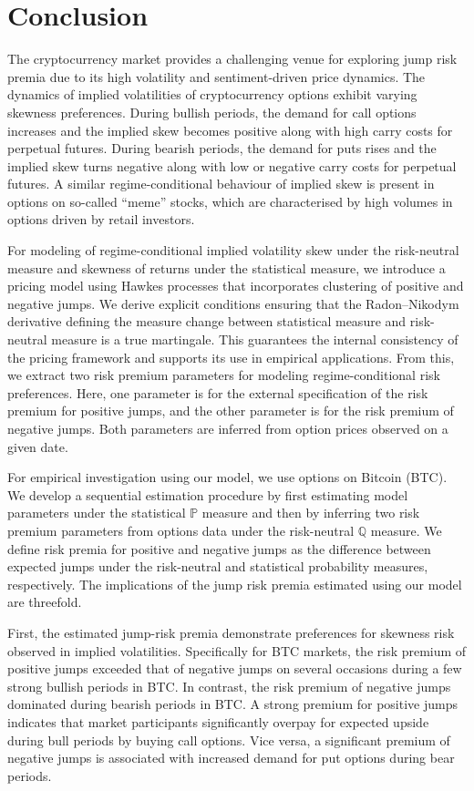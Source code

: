 \documentclass[11pt,a4paper]{article}
\numberwithin{equation}{section}
\theoremstyle{remark}
\theoremstyle{definition}
\begin{document}
\section{Conclusion}\label{sec:conclusion-and-outlook}

The cryptocurrency market provides a challenging venue for exploring jump risk premia due to its high volatility and sentiment-driven price dynamics. The dynamics of implied volatilities of cryptocurrency options exhibit varying skewness preferences. During bullish periods, the demand for call options increases and the implied skew becomes positive along with high carry costs for perpetual futures. During bearish periods, the demand for puts rises and the implied skew turns negative along with low or negative carry costs for perpetual futures. A similar regime-conditional behaviour of implied skew is present in options on so-called ``meme'' stocks, which are characterised by high volumes in options driven by retail investors.

For modeling of regime-conditional implied volatility skew under the risk-neutral measure and skewness of returns under the statistical measure, we introduce a pricing model using Hawkes processes that incorporates clustering of positive and negative jumps. We derive explicit conditions ensuring that the Radon–Nikodym derivative defining the measure change between statistical measure and risk-neutral measure is a true martingale. This guarantees the internal consistency of the pricing framework and supports its use in empirical applications. From this, we extract two risk premium parameters for modeling regime-conditional risk preferences. Here, one parameter is for the external specification of the risk premium for positive jumps, and the other parameter is for the risk premium of negative jumps. Both parameters are inferred from option prices observed on a given date.

For empirical investigation using our model, we use options on Bitcoin (BTC). We develop a sequential estimation procedure by first estimating model parameters under the statistical $\mathbb{P}$ measure and then by inferring two risk premium parameters from options data under the risk-neutral $\mathbb{Q}$ measure. We define risk premia for positive and negative jumps as the difference between expected jumps under the risk-neutral and statistical probability measures, respectively. The implications of the jump risk premia estimated using our model are threefold.

First, the estimated jump-risk premia demonstrate preferences for skewness risk observed in implied volatilities. Specifically for BTC markets, the risk premium of positive jumps exceeded that of negative jumps on several occasions during a few strong bullish periods in BTC. In contrast, the risk premium of negative jumps dominated during bearish periods in BTC. A strong premium for positive jumps indicates that market participants significantly overpay for expected upside during bull periods by buying call options. Vice versa, a significant premium of negative jumps is associated with increased demand for put options during bear periods.
\end{document}
